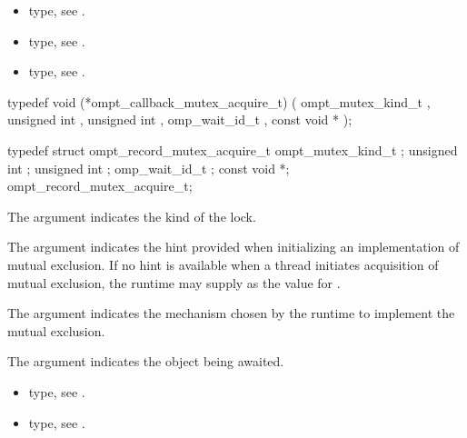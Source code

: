 \crossreferences
\begin{itemize}
\item {} type, see
.
\item {} type, see
.
\item {} type, see
.
\end{itemize}


\label{sec:ompt_callback_mutex_acquire_t}
\format

\begin{ccppspecific}
\begin{omptCallback}
typedef void (*ompt_callback_mutex_acquire_t) (
  ompt_mutex_kind_t ,
  unsigned int ,
  unsigned int ,
  omp_wait_id_t ,
  const void *
);
\end{omptCallback}
\end{ccppspecific}


\record

\begin{ccppspecific}
\begin{omptRecord}
typedef struct ompt_record_mutex_acquire_t {
  ompt_mutex_kind_t ;
  unsigned int ;
  unsigned int ;
  omp_wait_id_t ;
  const void *;
} ompt_record_mutex_acquire_t;
\end{omptRecord}
\end{ccppspecific}


\argdesc

The argument  indicates the kind of the lock.

The argument  indicates the hint provided when initializing
an implementation of mutual exclusion.
If no hint is available when a thread initiates acquisition of mutual exclusion,
the runtime may supply  as the value for .

The argument  indicates the mechanism chosen by the
runtime to implement the mutual exclusion.  

The argument  indicates the object being awaited. 

\codeptrdesc

\crossreferences
\begin{itemize}
\item {} type, see
.
\item {} type, see
.
\end{itemize}



